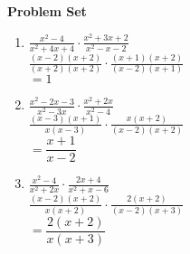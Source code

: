 \textbf{Problem Set}



\vspce

\begin{enumerate}[label = \arabic*. ]
\item %
$\displaystyle \frac{x^2-4}{x^2+4x+4} \cdot \frac{x^2+3x+2}{x^2-x-2}$\\
$\displaystyle \frac{\left(x - 2\right) \left(x + 2\right)}{\left(x + 2\right)\left(x + 2\right)} \cdot \frac{\left(x + 1\right) \left(x + 2\right)}{\left(x - 2\right) \left(x + 1\right)}$\\
$=1$
\item %
$\displaystyle \frac{x^2-2x-3}{x^{2}-3x} \cdot \frac{x^{2}+2x}{x^2-4}$\\
$\displaystyle \frac{\left(x - 3\right) \left(x + 1\right)}{x \left(x - 3\right)} \cdot \frac{x \left(x + 2\right)}{\left(x - 2\right) \left(x + 2\right)}$\\
$=\dfrac{x + 1}{x - 2}$
\item %
$\displaystyle \frac{x^2-4}{x^2+2x} \cdot \frac{2x+4}{x^2+x-6}$\\
$\displaystyle \frac{\left(x - 2\right) \left(x + 2\right)}{x \left(x + 2\right)} \cdot \frac{2 \left(x + 2\right)}{\left(x - 2\right) \left(x + 3\right)}$\\
$=\dfrac{2 \left(x + 2\right)}{x \left(x + 3\right)}$
\end{enumerate}